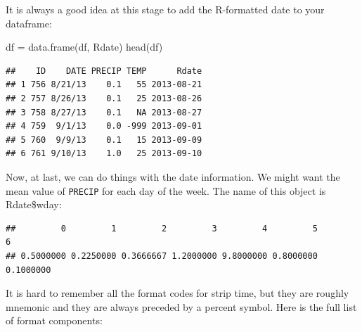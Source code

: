\documentclass[
]{book}
\newenvironment{Shaded}{\begin{snugshade}}{\end{snugshade}}
\newcommand{\FunctionTok}[1]{\textcolor[rgb]{0.00,0.00,0.00}{#1}}
\newcommand{\NormalTok}[1]{#1}
\newcommand{\OtherTok}[1]{\textcolor[rgb]{0.56,0.35,0.01}{#1}}
\newcommand{\SpecialCharTok}[1]{\textcolor[rgb]{0.00,0.00,0.00}{#1}}
\theoremstyle{definition}
\theoremstyle{definition}
\theoremstyle{definition}
\theoremstyle{definition}
\theoremstyle{remark}
\begin{document}
It is always a good idea at this stage to add the R-formatted date to your dataframe:

\begin{Shaded}
\begin{Highlighting}[]
\NormalTok{df }\OtherTok{=} \FunctionTok{data.frame}\NormalTok{(df, Rdate)}
\FunctionTok{head}\NormalTok{(df)}
\end{Highlighting}
\end{Shaded}

\begin{verbatim}
##    ID    DATE PRECIP TEMP      Rdate
## 1 756 8/21/13    0.1   55 2013-08-21
## 2 757 8/26/13    0.1   25 2013-08-26
## 3 758 8/27/13    0.1   NA 2013-08-27
## 4 759  9/1/13    0.0 -999 2013-09-01
## 5 760  9/9/13    0.1   15 2013-09-09
## 6 761 9/10/13    1.0   25 2013-09-10
\end{verbatim}

Now, at last, we can do things with the date information. We might want the mean value of \texttt{PRECIP} for each day of the week. The name of this object is Rdate\$wday:

\begin{Shaded}
\end{Shaded}

\begin{verbatim}
##         0         1         2         3         4         5         6 
## 0.5000000 0.2250000 0.3666667 1.2000000 9.8000000 0.8000000 0.1000000
\end{verbatim}

It is hard to remember all the format codes for strip time, but they are roughly mnemonic and they are always preceded by a percent symbol. Here is the full list of format components:
\end{document}

